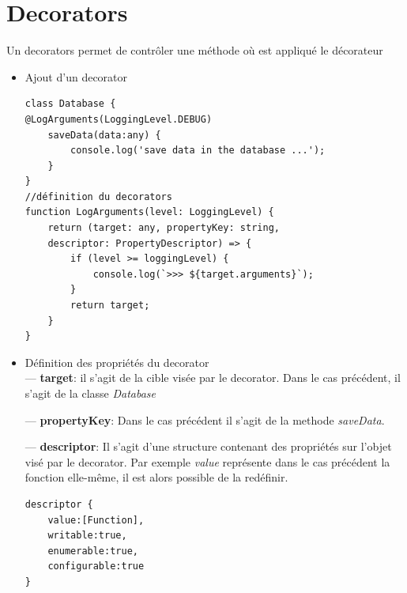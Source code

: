 \documentclass[12pt,oneside]{scrbook}
\begin{document}
\section{Decorators}
Un decorators permet de contrôler une méthode où est appliqué le décorateur
\begin{itemize}
\item Ajout d'un decorator\\
\begin{verbatim}
class Database {
@LogArguments(LoggingLevel.DEBUG)
    saveData(data:any) {
        console.log('save data in the database ...');
    }
}
//définition du decorators
function LogArguments(level: LoggingLevel) {
    return (target: any, propertyKey: string, 
    descriptor: PropertyDescriptor) => {
        if (level >= loggingLevel) {
            console.log(`>>> ${target.arguments}`);
        }
        return target;
    }
}
\end{verbatim}

\item Définition des propriétés du decorator\\
--- \textbf{target}: il s'agit de la cible visée par le decorator. Dans le cas précédent, il s'agit de la classe  \textit{Database}

--- \textbf{propertyKey}: Dans le cas précédent il s'agit de la methode \textit{saveData}.

--- \textbf{descriptor}: Il s'agit d'une structure contenant des propriétés sur l'objet visé par le decorator. Par exemple \textit{value} représente dans le cas précédent la fonction elle-même, il est alors possible de la redéfinir.
\begin{verbatim}
descriptor {
    value:[Function],
    writable:true,
    enumerable:true,
    configurable:true
}
\end{verbatim}


\end{itemize}
\end{document}

